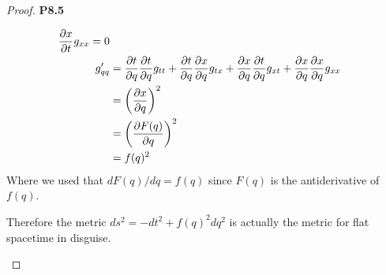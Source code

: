 \documentclass[11pt]{article}
\theoremstyle{definition}
\begin{document}
\begin{proof}{\textbf{P8.5}}
\begin{itemize}
\begin{align*}
            \partialderivative{x}{t}g_{xx}
            = 0\\
            g'_{qq} &= \partialderivative{t}{q}
            \partialderivative{t}{q}g_{tt}
            + \partialderivative{t}{q}
            \partialderivative{x}{q}g_{tx}
            + \partialderivative{x}{q}
            \partialderivative{t}{q}g_{xt}
            + \partialderivative{x}{q}
            \partialderivative{x}{q}g_{xx}\\
            &= \bigg(\partialderivative{x}{q}\bigg)^2\\
            &= \bigg(\partialderivative{F(q)}{q}\bigg)^2\\
            &= f(q)^2
        \end{align*}
        Where we used that $dF(q)/dq = f(q)$ since $F(q)$ is the antiderivative
        of $f(q)$.
        
        Therefore the metric $ds^2 = -dt^2 + f(q)^2dq^2$ is actually the metric
        for flat spacetime in disguise.         
    \end{itemize}
\end{proof}
\end{document}
